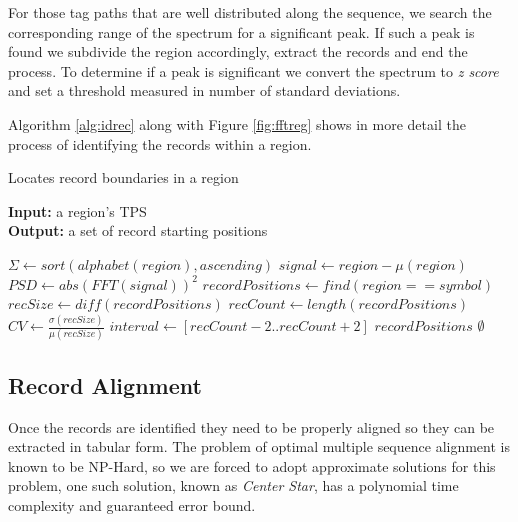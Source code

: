 \documentclass{vldb}
\begin{document}
For those tag paths that are well distributed along the sequence, we search the
corresponding range of the spectrum for a significant peak. If such a peak is
found we subdivide the region accordingly, extract the records and end the
process. To determine if a peak is significant we convert the spectrum to
\textit{z score} and set a threshold measured in number of standard deviations.

Algorithm \ref{alg:idrec} along with Figure \ref{fig:fftreg} shows in more
detail the process of identifying the records within a region.

\begin{algorithm}
\caption{Locates record boundaries in a region}
\label{alg:idrec}
\textbf{Input:} a region's TPS \\
\textbf{Output:} a set of record starting positions

\begin{algorithmic}[1]

\State $\Sigma \leftarrow sort(alphabet(region), ascending)$
\State $signal \leftarrow region-\mu(region)$ 
\State $PSD \leftarrow abs(FFT(signal))^2$
\State $recordPositions \leftarrow find(region == symbol)$
\State $recSize \leftarrow diff(recordPositions)$
\State $recCount \leftarrow length(recordPositions)$
\State $CV \leftarrow \frac{\sigma(recSize)}{\mu(recSize)}$
\State $interval \leftarrow [recCount-2 .. recCount+2]$
\State \Return $recordPositions$
\EndIf
\EndIf
\EndFor
\State \Return $\emptyset$
\EndFunction

\end{algorithmic}
\end{algorithm}


\subsection{Record Alignment}\label{ss:reca}

Once the records are identified they need to be properly aligned so they can be
extracted in tabular form. The problem of optimal multiple sequence alignment is
known to be NP-Hard\cite{msanphard2006}, so we are forced to adopt approximate
solutions for this problem, one such solution, known as \textit{Center
Star}\cite{centerstar1993}, has a polynomial time complexity and guaranteed
error bound.
\end{document}
